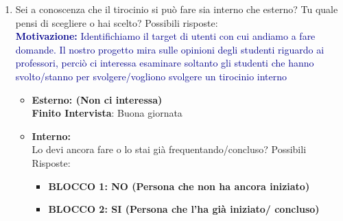 \begin{itemize}
\begin{itemize}
\begin{enumerate}
{            cercando di estrapolare in maniera indiretta i punti chiave di esso; quest’ultime saranno poi utili per la
            creazione del questionario }
            \item Sei a conoscenza che il tirocinio si può fare sia interno che esterno? Tu quale pensi di scegliere o hai scelto? Possibili risposte:\\
            \textcolor{darkblue}{\textbf{Motivazione:} Identifichiamo il target di utenti con cui andiamo a fare domande.
            Il nostro progetto mira sulle opinioni degli studenti riguardo ai professori, perciò ci interessa esaminare
            soltanto gli studenti che hanno svolto/stanno per svolgere/vogliono svolgere un tirocinio interno}
            \begin{itemize}
                \item \textbf{Esterno: (Non ci interessa)}\\
                \textbf{Finito Intervista}: Buona giornata
                \item \textbf{Interno:}\\
                Lo devi ancora fare o lo stai già frequentando/concluso? Possibili Risposte:
                \begin{itemize}
                    \item \textbf{BLOCCO 1: NO (Persona che non ha ancora iniziato)}
                    \item \textbf{BLOCCO 2: SI (Persona che l'ha già iniziato/ concluso)}
                \end{itemize}
            \end{itemize}
        \end{enumerate}
    \end{itemize}
\end{itemize}


